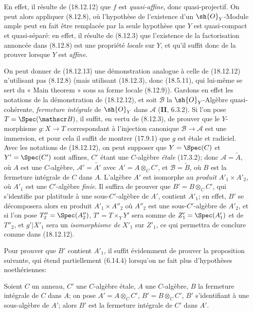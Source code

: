 En effet, il résulte de (18.12.12) que $f$ est \emph{quasi-affine}, donc quasi-projectif. On peut alors appliquer (8.12.8), où l'hypothèse de l'existence d'un $\sh{O}_Y$-Module ample peut en fait être remplacée par la seule hypothèse que $Y$ est quasi-compact et quasi-séparé: en effet, il résulte de (8.12.3) que l'existence de la factorisation annoncée dans (8.12.8) est une propriété \emph{locale} sur $Y$, et qu'il suffit donc de la prouver lorsque $Y$ est \emph{affine}.

\begin{remark}[18.12.14]
\label{IV.18.12.14}
On peut donner de (18.12.13) une démonstration analogue à celle de (18.12.12) n'utilisant pas (8.12.8) (mais utilisant (18.12.3), donc (18.5.11), qui lui-même se sert du « Main theorem » sous sa forme locale (8.12.9)). Gardons en effet les notations de la démonstration de (18.12.12), et soit $\mathscr B$ la $\sh{O}_Y$-Algèbre quasi-cohérente, \emph{fermeture intégrale} de $\sh{O}_Y$ dans $\mathscr A$ (\textbf{II}, 6.3.2). Si l'on pose $T=\Spec(\mathscr B)$, il suffit, en vertu de (8.12.3), de prouver que le $Y$-morphisme $g:X\to T$ correspondant à l'injection canonique $\mathscr B\to\mathscr A$ est une immersion, et pour cela il suffit de montrer (17.9.1) que $g$ est étale et radiciel. Avec les notations de (18.12.12), on peut supposer que $Y=\Spec(C)$ et $Y'=\Spec(C')$ sont affines, $C'$ étant une $C$-algèbre \emph{étale} (17.3.2); donc $\mathscr A=\widetilde A$, où $A$ est une $C$-algèbre, $\mathscr A'=\widetilde{A'}$ avec $A'=A\otimes_C C'$, et $\mathscr B=\widetilde B$, où $B$ est la fermeture intégrale de $C$ dans $A$. L'algèbre $A'$ est isomorphe au \emph{produit} $A'_1\times A'_2$, où $A'_1$ est une $C'$-algèbre \emph{finie}. Il suffira de prouver que $B'=B\otimes_C C'$, qui
s'identifie par platitude à une sous-$C'$-algèbre de $A'$, contient $A'_1$; en effet, $B'$ se décomposera alors en produit $A'_1\times A''_2$ où $A''_2$ est une sous-$C'$-algèbre de $A'_2$, et si l'on pose $T''_2=\Spec(A''_2)$, $T'=T\times_Y Y'$ sera somme de $Z'_1=\Spec(A'_1)$ et de $T''_2$, et $g'|X'_1$ sera un \emph{isomorphisme de} $X'_1$ sur $Z'_1$, ce qui permettra de conclure comme dans (18.12.12).

Pour prouver que $B'$ contient $A'_1$, il suffit évidemment de prouver la proposition suivante, qui étend partiellement (6.14.4) lorsqu'on ne fait plus d'hypothèses noethériennes:
\end{remark}

\begin{proposition}[18.12.15]
\label{IV.18.12.15}
Soient $C$ un anneau, $C'$ une $C$-algèbre \textup{étale}, $A$ une $C$-algèbre, $B$ la fermeture intégrale de $C$ dans $A$; on pose $A'=A\otimes_C C'$, $B'=B\otimes_C C'$, $B'$ s'identifiant à une sous-algèbre de $A'$; alors $B'$ est la fermeture intégrale de $C'$ dans $A'$.
\end{proposition}


